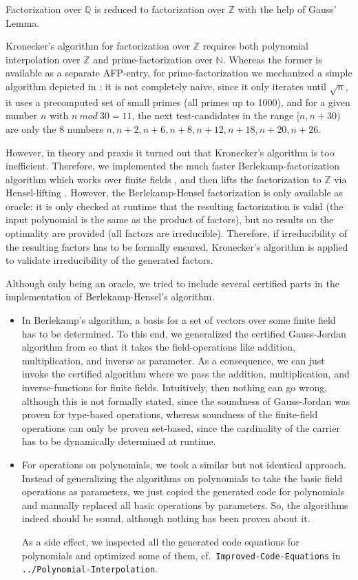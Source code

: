 \documentclass[11pt,a4paper]{article}
\newcommand\rats{\mathbb{Q}}
\newcommand\ints{\mathbb{Z}}
\newcommand\nats{\mathbb{N}}
\newcommand\mod{\mathit{mod}}
\begin{document}
Factorization over $\rats$ is reduced to factorization over $\ints$ 
with the help of Gauss' Lemma.

Kronecker's algorithm for factorization over $\ints$ requires both
polynomial interpolation over $\ints$ and prime-factorization over $\nats$. Whereas the former
is available as a separate AFP-entry, for prime-factorization we mechanized a simple algorithm depicted
in \cite{Knuth}: it is not completely naive, since it only iterates until $\sqrt n$, it uses
a precomputed set of small primes (all primes up to 1000), 
and for a given number $n$ with $n\ \mod\ 30 = 11$, 
the next test-candidates in the range $[n,n+30)$ 
are only the 8 numbers $n,n+2,n+6,n+8,n+12,n+18,n+20,n+26$.

However, in theory and praxis it turned out that Kronecker's algorithm is too inefficient. 
Therefore, we implemented the much faster Berlekamp-factorization algorithm which works over finite fields \cite{Berlekamp}, and
then lifts the factorization to $\ints$ via Hensel-lifting \cite{Hensel}. However, the Berlekamp-Hensel
factorization is only available as oracle: it is only checked at runtime that the resulting
factorization is valid (the input polynomial is the same as the product of factors), 
but no results on the optimality are provided (all factors are irreducible). 
Therefore, if irreducibility of the resulting factors has to be formally ensured, 
Kronecker's algorithm is applied to validate irreducibility of the generated factors.

Although only being an oracle, we tried to include several certified parts in the implementation
of Berlekamp-Hensel's algorithm.
\begin{itemize}
\item In Berlekamp's algorithm, a basis for a set of vectors over some finite field has to be determined.
  To this end, we generalized the certified Gauss-Jordan algorithm from \cite{JNF-AFP} so that 
  it takes the field-operations like addition, multiplication, and inverse as parameter. 
  As a consequence, we can just invoke the certified algorithm 
  where we pass the addition, multiplication, and
  inverse-functions for finite fields. Intuitively, then nothing can go wrong, although this is not
  formally stated, since the soundness of Gauss-Jordan was proven for type-based operations, whereas
  soundness of the finite-field operations can only be proven set-based, since the cardinality of the
  carrier has to be dynamically determined at runtime.
\item For operations on polynomials, we took a similar but not identical approach. Instead of 
  generalizing the algorithms on polynomials to take the basic field operations as parameters, we just
  copied the generated code for polynomials and manually replaced all basic operations by parameters.
  So, the algorithms indeed should be sound, although nothing has been proven about it.
  
  As a side effect, we inspected all the generated code equations for polynomials and optimized some of them,
  cf.\ \texttt{Improved-Code-Equations} in \texttt{../Polynomial-Interpolation}.
\end{itemize}
\end{document}

